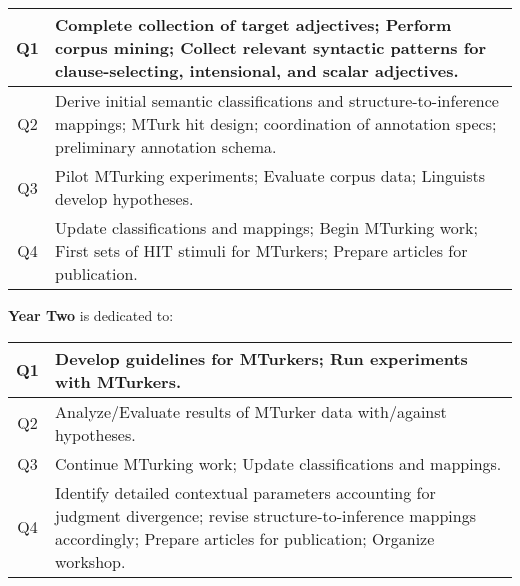 \documentclass[10pt]{article}
\newcommand{\miniskip}{\vspace*{1mm}}
\begin{document}
\vspace{1mm}\noindent
{\small
\begin{tabularx}{470pt}{|c|X|}

\hline

Q1 & Complete collection of target adjectives; Perform corpus mining;  Collect relevant syntactic patterns for clause-selecting, intensional, and scalar adjectives. 
\\
\hline

Q2 & Derive initial semantic classifications and structure-to-inference mappings; MTurk hit design; coordination of annotation specs; preliminary annotation schema.
 \\

\hline

Q3 & Pilot MTurking experiments;  Evaluate corpus data; Linguists develop hypotheses.    \\
 
\hline

Q4 & Update classifications and mappings; Begin MTurking work; First sets of HIT stimuli for MTurkers; Prepare articles for publication.     \\

\hline

\end{tabularx}
}

\miniskip\noindent
{\bf Year Two} is dedicated to: 

\vspace{2mm}\noindent
{\small
\begin{tabularx}{470pt}{|c|X|}

\hline

Q1 	&  Develop guidelines for MTurkers; Run experiments with MTurkers. \\

\hline

Q2	& Analyze/Evaluate results of MTurker data with/against hypotheses. \\

\hline

Q3	&  Continue MTurking work; Update classifications and mappings. \\

\hline

Q4	& Identify detailed contextual parameters accounting for judgment divergence; revise structure-to-inference mappings accordingly; Prepare articles for
       publication;  Organize workshop. \\
\hline

\end{tabularx}
}
\end{document}
